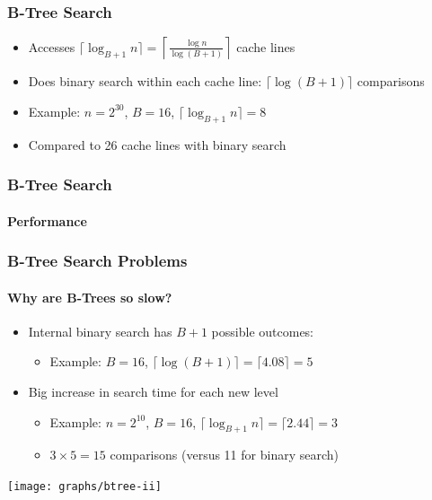 \documentclass[xcolor=dvipsnames]{beamer}
\newcommand{\mi}[1]{\multiinclude[<+>][start=1,format=pdf]{#1}}
\begin{document}
\begin{frame}
   \frametitle{B-Tree Search}

   \begin{center}
      \mi{figs/btree-search}
   \end{center}
   \begin{itemize}
      \item<13->Accesses $\lceil\log_{B+1} n\rceil=\left\lceil\frac{\log n}{\log(B+1)}\right\rceil$ cache lines
      \item<14->Does binary search within each cache line: $\lceil\log(B+1)\rceil$ comparisons
      \item<15->Example: $n=2^{30}$, $B=16$, $\lceil\log_{B+1} n\rceil = 8$
      \item<16->Compared to 26 cache lines with binary search
   \end{itemize}
\end{frame}

\begin{frame}
   \frametitle{B-Tree Search}
   \framesubtitle{Performance}
 
   \begin{center}
   \end{center}
\end{frame}

\begin{frame}
   \frametitle{B-Tree Search Problems}
   \framesubtitle{Why are B-Trees so slow?}
    
   \begin{itemize}
      \item<+->Internal binary search has $B+1$ possible outcomes:
      \begin{itemize}
        \item<+->Example: $B=16$, 
                  $\lceil\log(B+1)\rceil = \lceil 4.08\rceil = 5$
      \end{itemize}
      \item<+->Big increase in search time for each new level 
      \begin{itemize}
        \item<+->Example: $n=2^{10}$, $B=16$, 
                  $\lceil\log_{B+1}n\rceil = \lceil 2.44\rceil = 3$
        \item<+->$3\times 5 = 15$ comparisons (versus 11 for binary search)
      \end{itemize}
   \end{itemize}
   \begin{center}
      \texttt{[image: graphs/btree-ii]}
   \end{center}
\end{frame}
\end{document}
